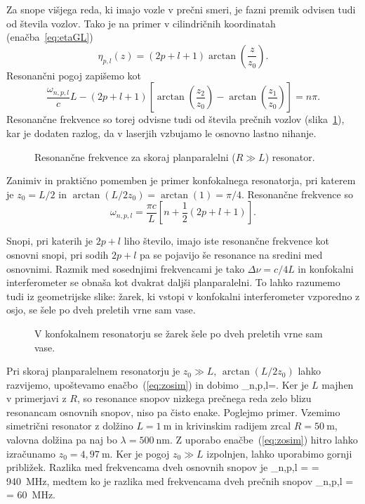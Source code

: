 Za snope višjega reda, ki imajo vozle v prečni smeri, je fazni premik
odvisen tudi od števila vozlov. Tako je na primer v cilindričnih koordinatah
(enačba~\ref{eq:etaGL})
\begin{equation}
\eta_{p,l}(z)=(2p+l+1)\arctan\left(\frac{z}{z_{0}}\right).
\end{equation}
Resonančni pogoj zapišemo kot
\begin{equation}
\frac{\omega_{n,p,l}}{c}L-(2p+l+1)\left[\arctan\left(\frac{z_{2}}{z_{0}}\right)-
\arctan\left(\frac{z_{1}}{z_{0}}\right)\right]=n\pi.
\end{equation}
Resonančne frekvence so torej odvisne tudi od števila prečnih vozlov (slika~\ref{fig:crte}),
kar je dodaten razlog, da v laserjih vzbujamo le osnovno lastno nihanje.
\begin{figure}[h]
\centering
\def\svgwidth{90truemm} 

\caption{Resonančne frekvence za skoraj planparalelni ($R\gg L$) resonator.}
\label{fig:crte}
\end{figure}

Zanimiv in praktično pomemben je primer konfokalnega resonatorja,
pri katerem je $z_{0}=L/2$ in $\arctan(L/2z_{0})= \arctan(1)=\pi/4$. Resonančne frekvence
so 
\begin{equation}
\omega_{n,p,l}=\frac{\pi c}{L}\left[n+\frac{1}{2}(2p+l+1)\right].
\label{eq:omega_konf}
\end{equation}

Snopi, pri katerih je $2p+l$ liho število, imajo iste resonančne frekvence kot
osnovni snopi, pri sodih $2p+l$ pa se pojavijo še resonance na sredini
med osnovnimi. Razmik med sosednjimi frekvencami je tako $\Delta\nu=c/4L$
in konfokalni interferometer se obnaša kot dvakrat daljši planparalelni.
To lahko razumemo tudi iz geometrijske slike: žarek, ki vstopi v konfokalni
interferometer vzporedno z osjo, se šele po dveh preletih vrne sam
vase.

\begin{figure}[h]
\centering
\def\svgwidth{60truemm} 

\caption{V konfokalnem resonatorju se žarek šele po dveh preletih
vrne sam vase.}
\label{fig:Konfokalni_zarek}
\end{figure}

Pri skoraj planparalelnem 
resonatorju je $z_{0}\gg L$, $\arctan(L/2z_{0})$ lahko razvijemo, upoštevamo enačbo~(\ref{eq:zosim}) 
in dobimo
\beq
\omega_{n,p,l}=.
\eeq
Ker je $L$ majhen v primerjavi z $R$, so resonance snopov nizkega prečnega reda 
zelo blizu resonancam osnovnih snopov, niso pa čisto enake. Poglejmo primer. Vzemimo 
simetrični resonator z dolžino $L=1~\si{\metre}$ in krivinskim radijem zrcal $R=50~\si{\metre}$, 
valovna dolžina pa naj bo $\lambda= 500~\si{\nano\metre}$. Z uporabo enačbe~(\ref{eq:zosim})
hitro lahko izračunamo $z_0 = 4,97~\si{\metre}$. Ker je pogoj $z_0\gg L$ izpolnjen, lahko uporabimo
gornji približek. Razlika med frekvencama dveh osnovnih snopov je
\beq
\Delta \omega_{n,p,l} =  = 940~\si{\mega\hertz},
\eeq
medtem ko je razlika med frekvencama dveh prečnih snopov
\beq
\Delta \omega_{n,p,l} =   = 60~\si{\mega\hertz}.
\eeq

